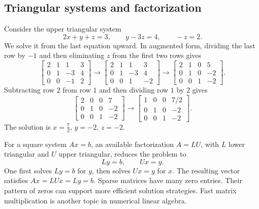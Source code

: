 \subsection{Triangular systems and factorization}

\begin{example}
  Consider the upper triangular system
  \[
    2x+y+z=3,\qquad y-3z=4,\qquad -z=2.
  \]
  We solve it from the last equation upward. In augmented form, dividing
  the last row by \(-1\) and then eliminating \(z\) from the first two
  rows gives
  \[
    \left[\begin{array}{rrr|r}
      2&1&1&3\\0&1&-3&4\\0&0&-1&2
    \end{array}\right]
    \longrightarrow
    \left[\begin{array}{rrr|r}
      2&1&1&3\\0&1&-3&4\\0&0&1&-2
    \end{array}\right]
    \longrightarrow
    \left[\begin{array}{rrr|r}
      2&1&0&5\\0&1&0&-2\\0&0&1&-2
    \end{array}\right].
  \]
  Subtracting row \(2\) from row \(1\) and then dividing row \(1\)
  by \(2\) gives
  \[
    \left[\begin{array}{rrr|r}
      2&0&0&7\\0&1&0&-2\\0&0&1&-2
    \end{array}\right]
    \longrightarrow
    \left[\begin{array}{rrr|r}
      1&0&0&7/2\\0&1&0&-2\\0&0&1&-2
    \end{array}\right].
  \]
  The solution is \(x=\frac72\), \(y=-2\), \(z=-2\).
\end{example}

For a square system \(Ax=b\), an available factorization \(A=LU\), with
\(L\) lower triangular and \(U\) upper triangular, reduces the problem to
\[
  Ly=b,\qquad Ux=y.
\]
One first solves \(Ly=b\) for \(y\), then solves \(Ux=y\) for \(x\).
The resulting vector satisfies \(Ax=LUx=Ly=b\).
Sparse matrices have many zero entries.
Their pattern of zeros can support more efficient solution strategies.
Fast matrix multiplication is another topic in numerical linear algebra.

